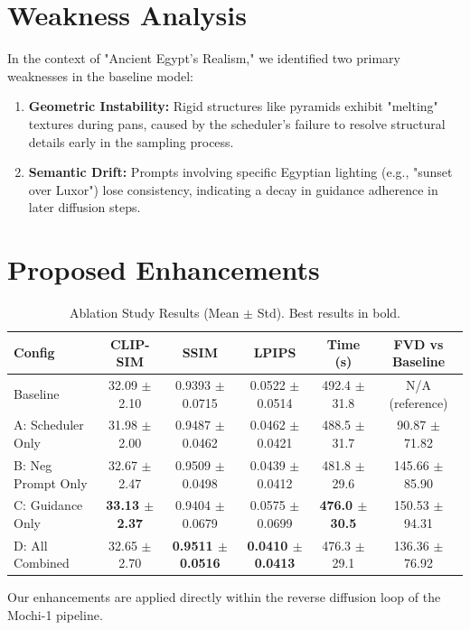 \documentclass[10pt, conference]{IEEEtran}
\begin{document}
\section{Weakness Analysis}
In the context of "Ancient Egypt's Realism," we identified two primary weaknesses in the baseline model:
\begin{enumerate}
    \item \textbf{Geometric Instability:} Rigid structures like pyramids exhibit "melting" textures during pans, caused by the scheduler's failure to resolve structural details early in the sampling process.
    \item \textbf{Semantic Drift:} Prompts involving specific Egyptian lighting (e.g., "sunset over Luxor") lose consistency, indicating a decay in guidance adherence in later diffusion steps.
\end{enumerate}

\section{Proposed Enhancements}

\begin{table}[t]
\centering
\caption{Ablation Study Results (Mean $\pm$ Std). Best results in bold.}
\label{tab:ablation_results}
\begin{tabular}{lccccc}
\toprule
Config & CLIP-SIM & SSIM & LPIPS & Time (s) & FVD vs Baseline \\
\midrule
Baseline & 32.09 $\pm$ 2.10 & 0.9393 $\pm$ 0.0715 & 0.0522 $\pm$ 0.0514 & 492.4 $\pm$ 31.8 & N/A (reference) \\
A: Scheduler Only & 31.98 $\pm$ 2.00 & 0.9487 $\pm$ 0.0462 & 0.0462 $\pm$ 0.0421 & 488.5 $\pm$ 31.7 & 90.87 $\pm$ 71.82 \\
B: Neg Prompt Only & 32.67 $\pm$ 2.47 & 0.9509 $\pm$ 0.0498 & 0.0439 $\pm$ 0.0412 & 481.8 $\pm$ 29.6 & 145.66 $\pm$ 85.90 \\
C: Guidance Only & \textbf{33.13 $\pm$ 2.37} & 0.9404 $\pm$ 0.0679 & 0.0575 $\pm$ 0.0699 & \textbf{476.0 $\pm$ 30.5} & 150.53 $\pm$ 94.31 \\
D: All Combined & 32.65 $\pm$ 2.70 & \textbf{0.9511 $\pm$ 0.0516} & \textbf{0.0410 $\pm$ 0.0413} & 476.3 $\pm$ 29.1 & 136.36 $\pm$ 76.92 \\
\bottomrule
\end{tabular}
\end{table}
Our enhancements are applied directly within the reverse diffusion loop of the Mochi-1 pipeline.
\end{document}
